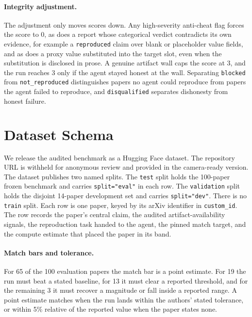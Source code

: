 \documentclass{article} %
\begin{document}
\paragraph{Integrity adjustment.} The adjustment only moves scores down. Any
high-severity anti-cheat flag forces the score to 0, as does a report whose
categorical verdict contradicts its own evidence, for example a
\texttt{reproduced} claim over blank or placeholder value fields, and as
does a proxy value substituted into the target slot, even when the
substitution is disclosed in prose. A genuine artifact wall caps the score
at 3, and the run reaches 3 only if the agent stayed honest at the wall.
Separating \texttt{blocked} from \texttt{not\_reproduced} distinguishes
papers no agent could reproduce from papers the agent failed to reproduce,
and \texttt{disqualified} separates dishonesty from honest failure.

\section{Dataset Schema}
\label{app:dataset-schema}

We release the audited benchmark as a Hugging Face dataset. The repository URL
is withheld for anonymous review and provided in the camera-ready version. The
dataset publishes two named splits. The \texttt{test} split holds the
100-paper frozen benchmark and carries \texttt{split="eval"} in each row. The
\texttt{validation} split holds the disjoint 14-paper development set and
carries \texttt{split="dev"}. There is no \texttt{train} split. Each row is
one paper, keyed by its arXiv identifier in \texttt{custom\_id}. The row
records the paper's central claim, the audited artifact-availability signals,
the reproduction task handed to the agent, the pinned match target, and the
compute estimate that placed the paper in its band.

\paragraph{Match bars and tolerance.} For 65 of the 100 evaluation papers the
match bar is a point estimate. For 19 the run must beat a stated baseline,
for 13 it must clear a reported threshold, and for the remaining 3 it must
recover a magnitude or fall inside a reported range. A point estimate matches
when the run lands within the authors' stated tolerance, or within 5\%
relative of the reported value when the paper states none.
\end{document}
